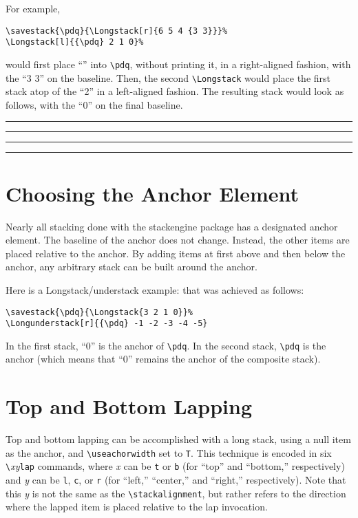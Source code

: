\documentclass{article}
\def\rl{\rule[-.3pt]{2ex}{.6pt}}
\let\vb\verb
\def\blmark{\rl\stackengine{-.9ex}{B}{\rule{.35ex}{0pt}L}{U}{l}{F}{T}{S}\rl}
\begin{document}
For example,
\begin{verbatim}
\savestack{\pdq}{\Longstack[r]{6 5 4 {3 3}}}%
\Longstack[l]{{\pdq} 2 1 0}%
\end{verbatim}

would first place ``'' into \vb|\pdq|, without
printing it, in a right-aligned fashion, with the ``3 3'' on the
baseline.  Then, the second \vb|\Longstack| would place the first stack
atop of the ``2'' in a left-aligned fashion.  The resulting stack would
look as follows, with the ``0'' on the final baseline.

%
\rl\rl\blmark%

\section{Choosing the Anchor Element\label{s:cae}}

Nearly all stacking done with the \textsf{stackengine} package has 
a designated anchor element.  The baseline of the anchor does not 
change.  Instead, the other items are placed relative to the anchor.
By adding items at first above and then below the anchor, any
arbitrary stack can be built around the anchor.

\def\stackalignment{r}
%
Here is a Longstack/understack example:
%
that was achieved as follows:

\begin{verbatim}
\savestack{\pdq}{\Longstack{3 2 1 0}}%
\Longunderstack[r]{{\pdq} -1 -2 -3 -4 -5}
\end{verbatim}

In the first stack, ``0'' is the anchor of \vb|\pdq|.  In the second
stack, \vb|\pdq| is the anchor (which means that ``0'' remains the
anchor of the composite stack).

\section{Top and Bottom Lapping\label{s:lap}}
\def\stackalignment{c}
\def\stacktype{L}%
Top and bottom lapping can be accomplished with a long stack, using a null
item as the anchor, and \vb|\useachorwidth| set to \vb|T|.  This
technique is encoded in six \vb|\|\textit{xy}\vb|lap| commands,
where \textit{x} can be \vb|t| or \vb|b| (for ``top'' and
``bottom,'' respectively) and \textit{y} can be \vb|l|, \vb|c|, or
\vb|r| (for ``left,'' ``center,'' and ``right,'' respectively).  Note
that this \textit{y} is not the same as the \vb|\stackalignment|, but
rather refers to the direction where the lapped item is placed relative
to the lap invocation.
\end{document}
